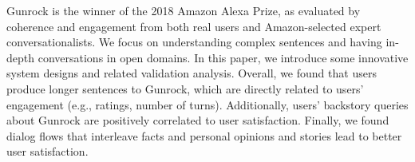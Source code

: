 Gunrock is the winner of the 2018 Amazon Alexa Prize, as evaluated by coherence and engagement from both real users and Amazon-selected expert conversationalists. We focus on understanding complex sentences and having in-depth conversations in open domains. In this paper, we introduce some innovative system designs and related validation analysis. Overall, we found that users produce longer sentences to Gunrock, which are directly related to users' engagement (e.g., ratings, number of turns). Additionally, users' backstory queries about Gunrock are positively correlated to user satisfaction. Finally, we found dialog flows that interleave facts and personal opinions and stories lead to better user satisfaction.
